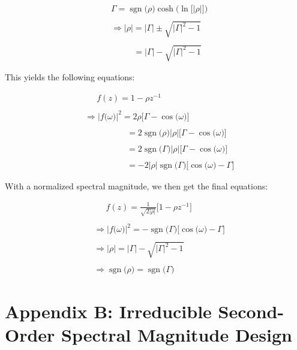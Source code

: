 \documentclass{article}
\DeclareMathOperator{\sgn}{sgn}
\begin{document}
\begin{align*}
    & \Gamma = \sgn\big(\rho\big)\cosh\Big(\ln\big[\big|\rho\big|\big]\Big) \\ \\
    & \Rightarrow \big|\rho\big| = \big|\Gamma\big| \pm \sqrt{\big|\Gamma\big|^{2} - 1} \\ \\
    & \quad \quad \ \ \ = \big|\Gamma\big| - \sqrt{\big|\Gamma\big|^{2} - 1}
  \end{align*}

\newpage

This yields the following equations:

\begin{align*}
    & \quad \ \ f(z) = 1 - \rho z^{-1} \\ \\
    & \Rightarrow \Big|f\big(\omega\big)\Big|^{2} = 2\rho\bigg[\Gamma - \cos\big(\omega\big)\bigg] \\ \\
    & \quad \quad \quad \quad \quad = 2\sgn\big(\rho\big)\big|\rho\big|\bigg[\Gamma - \cos\big(\omega\big)\bigg] \\ \\
    & \quad \quad \quad \quad \quad = 2\sgn\big(\Gamma\big)\big|\rho\big|\bigg[\Gamma - \cos\big(\omega\big)\bigg] \\ \\
    & \quad \quad \quad \quad \quad = -2\big|\rho\big|\sgn\big(\Gamma\big)\bigg[\cos\big(\omega\big) - \Gamma\bigg]
  \end{align*}\newline

With a normalized spectral magnitude, we then get the final equations:

\begin{align*}
    & \quad \ \ f(z) = \frac{1}{\sqrt{2\big|\rho\big|}}\big[1 - \rho z^{-1}\big] \\ \\
    & \Rightarrow \Big|f\big(\omega\big)\Big|^{2} = -\sgn\big(\Gamma\big)\bigg[\cos\big(\omega\big) - \Gamma\bigg] \\ \\ 
    & \Rightarrow \big|\rho\big| = \big|\Gamma\big| - \sqrt{\big|\Gamma\big|^{2} - 1} \\ \\
    & \Rightarrow \sgn\big(\rho\big) = \sgn\big(\Gamma\big)
  \end{align*}

\newpage
\section*{Appendix B: Irreducible Second-Order Spectral Magnitude Design}
\end{document}

